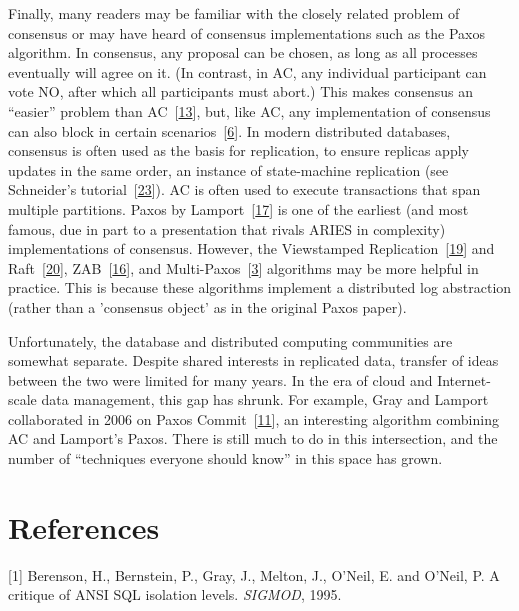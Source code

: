 \documentclass[b5paper,11pt,twoside,openright]{book}
\begin{document}
Finally, many readers may be familiar with the closely related problem
of consensus or may have heard of consensus implementations such as the
Paxos algorithm. In consensus, any proposal can be chosen, as long as
all processes eventually will agree on it. (In contrast, in AC, any
individual participant can vote NO, after which all participants must
abort.) This makes consensus an ``easier'' problem than
AC~{{[}\protect\hyperlink{ref-ac-consensus}{13}{]}}, but, like AC, any
implementation of consensus can also block in certain
scenarios~{{[}\protect\hyperlink{ref-flp}{6}{]}}. In modern distributed
databases, consensus is often used as the basis for replication, to
ensure replicas apply updates in the same order, an instance of
state-machine replication (see Schneider's
tutorial~{{[}\protect\hyperlink{ref-statemachine}{23}{]}}). AC is often
used to execute transactions that span multiple partitions. Paxos by
Lamport~{{[}\protect\hyperlink{ref-paxos}{17}{]}} is one of the earliest
(and most famous, due in part to a presentation that rivals ARIES in
complexity) implementations of consensus. However, the Viewstamped
Replication~{{[}\protect\hyperlink{ref-vrr}{19}{]}} and
Raft~{{[}\protect\hyperlink{ref-raft}{20}{]}},
ZAB~{{[}\protect\hyperlink{ref-zab}{16}{]}}, and
Multi-Paxos~{{[}\protect\hyperlink{ref-multipaxos}{3}{]}} algorithms may
be more helpful in practice. This is because these algorithms implement
a distributed log abstraction (rather than a 'consensus object' as in
the original Paxos paper).

Unfortunately, the database and distributed computing communities are
somewhat separate. Despite shared interests in replicated data, transfer
of ideas between the two were limited for many years. In the era of
cloud and Internet-scale data management, this gap has shrunk. For
example, Gray and Lamport collaborated in 2006 on Paxos
Commit~{{[}\protect\hyperlink{ref-paxoscommit}{11}{]}}, an interesting
algorithm combining AC and Lamport's Paxos. There is still much to do in
this intersection, and the number of ``techniques everyone should know''
in this space has grown.

\section*{References}

\leavevmode\hypertarget{ref-ansi-critique}{}%
{[}1{]} Berenson, H., Bernstein, P., Gray, J., Melton, J., O'Neil, E.
and O'Neil, P. A critique of ANSI SQL isolation levels. \emph{SIGMOD},
1995.
\end{document}
